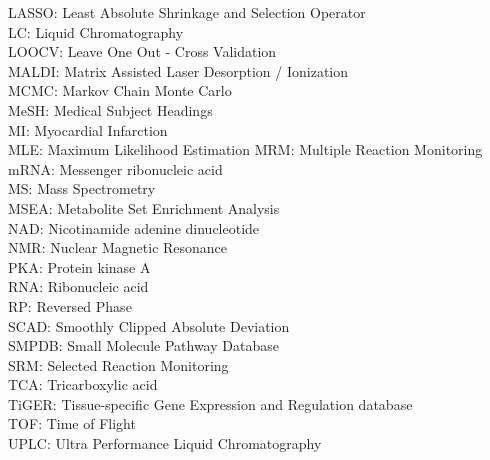 LASSO: Least Absolute Shrinkage and Selection Operator \\
LC: Liquid Chromatography \\
LOOCV: Leave One Out - Cross Validation \\
MALDI: Matrix Assisted Laser Desorption / Ionization  \\
MCMC: Markov Chain Monte Carlo \\
MeSH: Medical Subject Headings \\
MI: Myocardial Infarction \\
MLE: Maximum Likelihood Estimation
MRM: Multiple Reaction Monitoring \\
mRNA: Messenger ribonucleic acid \\
MS: Mass Spectrometry \\
MSEA: Metabolite Set Enrichment Analysis \\
NAD: Nicotinamide adenine dinucleotide \\
NMR: Nuclear Magnetic Resonance  \\
PKA: Protein kinase A \\
RNA: Ribonucleic acid  \\
RP: Reversed Phase \\
SCAD: Smoothly Clipped Absolute Deviation \\
SMPDB: Small Molecule Pathway Database \\
SRM: Selected Reaction Monitoring  \\
TCA: Tricarboxylic acid \\
TiGER: Tissue-specific Gene Expression and Regulation database \\
TOF: Time of Flight \\
UPLC: Ultra Performance Liquid Chromatography  \\

